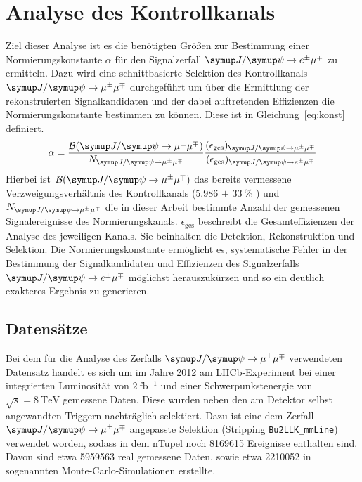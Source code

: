 \chapter{Analyse des Kontrollkanals}
\label{chap:4}
%
Ziel dieser Analyse ist es die benötigten Größen zur Bestimmung einer Normierungskonstante $\alpha$ für den Signalzerfall $\signal$ zu ermitteln. Dazu wird eine schnittbasierte Selektion des Kontrollkanals $\kontroll$ durchgeführt um über die Ermittlung der rekonstruierten Signalkandidaten und der dabei auftretenden Effizienzen die Normierungskonstante bestimmen zu können. Diese ist in Gleichung~\ref{eq:konst} definiert.
%
\begin{equation}
  \alpha=\frac{\mathcal{B}(\kontroll)}{N_{\kontroll}}\frac{(\epsilon_{\text{ges}})_{\kontroll}}{(\epsilon_{\text{ges}})_{\signal}}
  \label{eq:konst}
\end{equation}
%
Hierbei ist~$\mathcal{B}(\kontroll)$ das bereits vermessene Verzweigungsverhältnis des Kontrollkanals ($\SI{5,986(33)}{\percent}$ \cite{pdg}) und~$N_{\kontroll}$ die in dieser Arbeit bestimmte Anzahl der gemessenen Signalereignisse des Normierungskanals.
$\epsilon_{\text{ges}}$ beschreibt die Gesamteffizienzen der Analyse des jeweiligen Kanals. Sie beinhalten die Detektion, Rekonstruktion und Selektion. Die Normierungskonstante ermöglicht es, systematische Fehler in der Bestimmung der Signalkandidaten und Effizienzen des Signalzerfalls $\signal$ möglichst herauszukürzen und so ein deutlich exakteres Ergebnis zu generieren.

\section{Datensätze}
%
Bei dem für die Analyse des Zerfalls $\kontroll$ verwendeten Datensatz handelt es sich um im Jahre 2012 am LHCb-Experiment bei einer integrierten Luminosität von $\SI{2}{\femto\barn^{-1}}$ und einer Schwerpunkstenergie von $\sqrt{s}=\SI{8}{\tera\electronvolt}$ gemessene Daten. Diese wurden neben den am Detektor selbst angewandten Triggern nachträglich selektiert. Dazu ist eine dem Zerfall $\kontroll$ angepasste Selektion (Stripping \texttt{Bu2LLK\_mmLine}) verwendet worden, sodass in dem nTupel noch 8169615 Ereignisse enthalten sind. Davon sind etwa 5959563 real gemessene Daten, sowie etwa 2210052 in sogenannten Monte-Carlo-Simulationen erstellte.\\

